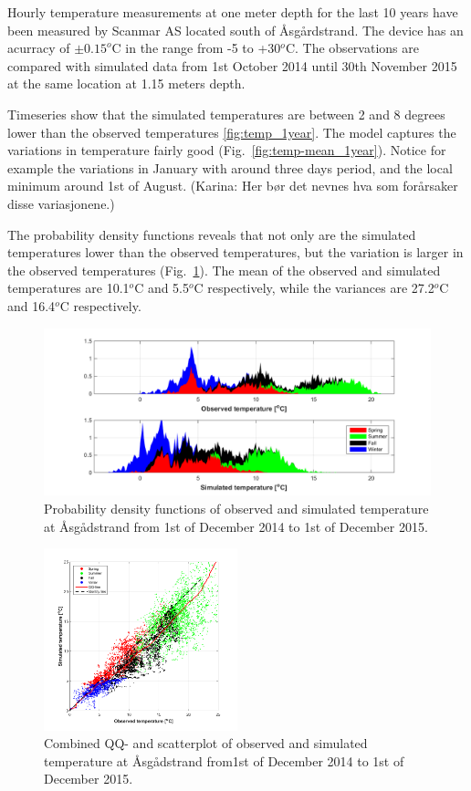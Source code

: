 \documentclass[12pt,a4paper,english]{article}
\begin{document}
Hourly temperature measurements at one meter depth for the last 10 years have been measured by Scanmar AS located south of \AA sg\aa rdstrand. The device has an acurracy of $\pm 0.15^o$C in the range from -5 to +30$^o$C. The observations are compared with simulated data from 1st October 2014 until 30th November 2015 at the same location at 1.15 meters depth.

Timeseries show that the simulated temperatures are between 2 and 8 degrees lower than the observed temperatures \ref{fig:temp_1year}. The model captures the variations in temperature fairly good (Fig.~\ref{fig:temp-mean_1year}). Notice for example the variations in January with around three days period, and the local minimum around 1st of August. (Karina: Her b\o r det nevnes hva som for\aa rsaker disse variasjonene.)

The probability density functions reveals that not only are the simulated temperatures lower than the observed temperatures, but the variation is larger in the observed temperatures (Fig.~\ref{fig:temp-PDF}). The mean of the observed and simulated temperatures are 10.1$^o$C and 5.5$^o$C respectively, while the variances are 27.2$^o$C and 16.4$^o$C respectively.


\begin{figure}[ht]
\centerline{
\includegraphics*[trim=1cm 0cm 1cm 0cm,clip=true,width=\textwidth]{Figurer/Temperatur_PDF_arstid}}
\caption{\small
Probability density functions of observed and simulated temperature at \AA sg\aa dstrand from 1st of December 2014 to 1st of December 2015.}
\label{fig:temp-PDF}
\end{figure}

\begin{figure}[ht]
\centerline{
\includegraphics*[trim=0cm 0cm 0cm 0cm,clip=true,width=0.5\textwidth]{Figurer/Temperatur_QQ_scatter}}
\caption{\small
Combined QQ- and scatterplot of observed and simulated temperature at \AA sg\aa dstrand from1st of December 2014 to 1st of December 2015.}
\label{fig:temp-QQ_scatter}
\end{figure}
\end{document}
